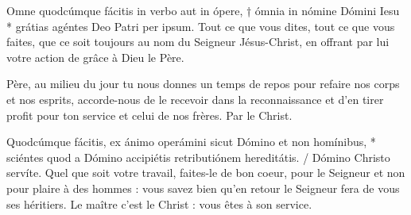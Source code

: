 \documentclass[Session2024.tex]{subfiles}
\begin{document}








{Omne quodcúmque fácitis in verbo aut in ópere, † ómnia in nómine
Dómini Iesu * grátias agéntes Deo Patri per ipsum.}
{Tout ce que vous dites, tout ce que vous faites, que ce soit toujours au
nom du Seigneur Jésus-Christ, en offrant par lui votre action de grâce à
Dieu le Père.}


{Père, au milieu du jour tu nous
donnes un temps de repos
pour refaire nos corps et nos
esprits, accorde-nous de le recevoir
dans la reconnaissance et
d’en tirer profit pour ton service
et celui de nos frères. Par
le Christ.}





\translation{}

{Quodcúmque fácitis, ex ánimo operámini sicut Dómino et non
homínibus, * sciéntes quod a Dómino accipiétis retributiónem hereditátis. / Dómino Christo servíte.}
{Quel que soit votre travail, faites-le de bon coeur, pour le Seigneur et non
pour plaire à des hommes : vous savez bien qu’en retour le Seigneur fera
de vous ses héritiers. Le maître c’est le Christ : vous êtes à son service.}
\end{document}

